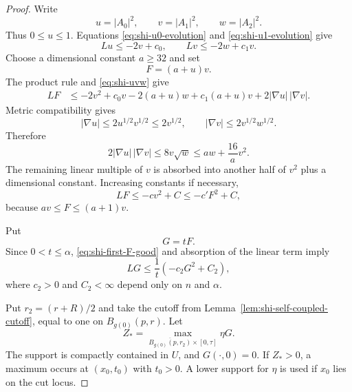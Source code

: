 \documentclass[10pt]{coll-l}
\theoremstyle{definition}
\theoremstyle{remark}
\numberwithin{section}{chapter}
\numberwithin{equation}{chapter}
\begin{document}
\begin{proof}
Write
\[
       u=|A_0|^2,
       \qquad v=|A_1|^2,
       \qquad w=|A_2|^2.
\]
Thus $0\leq u\leq1$.  Equations
\eqref{eq:shi-u0-evolution} and \eqref{eq:shi-u1-evolution} give
\begin{equation}
       Lu\leq-2v+c_0,
       \qquad Lv\leq-2w+c_1v.                            \label{eq:shi-uvw}
\end{equation}
Choose a dimensional constant $a\geq32$ and set
\begin{equation}
                  F=(a+u)v.                              \label{eq:shi-first-F}
\end{equation}
The product rule and \eqref{eq:shi-uvw} give
\begin{align}
 LF
  &\leq-2v^2+c_0v-2(a+u)w+c_1(a+u)v
        +2|\nabla u|\,|\nabla v|.                        \label{eq:shi-first-F-pre}
\end{align}
Metric compatibility gives
\[
       |\nabla u|\leq2u^{1/2}v^{1/2}\leq2v^{1/2},
       \qquad |\nabla v|\leq2v^{1/2}w^{1/2}.
\]
Therefore
\[
       2|\nabla u|\,|\nabla v|
          \leq8v\sqrt w
          \leq aw+\frac{16}{a}v^2.
\]
The remaining linear multiple of $v$ is absorbed into another half of
$v^2$ plus a dimensional constant.  Increasing constants if necessary,
\begin{equation}
               LF\leq-cv^2+C
                    \leq-c'F^2+C,                        \label{eq:shi-first-F-good}
\end{equation}
because $av\leq F\leq(a+1)v$.

Put
\begin{equation}
                         G=tF.                            \label{eq:shi-first-G}
\end{equation}
Since $0<t\leq\alpha$, \eqref{eq:shi-first-F-good} and absorption of the
linear term imply
\begin{equation}
                LG\leq\frac1t(-c_2G^2+C_2),              \label{eq:shi-first-G-good}
\end{equation}
where $c_2>0$ and $C_2<\infty$ depend only on $n$ and $\alpha$.

Put $r_2=(r+R)/2$ and take the cutoff from
Lemma~\ref{lem:shi-self-coupled-cutoff}, equal to one on $B_{g(0)}(p,r)$.
Let
\[
        Z_*=\max_{\overline{B_{g(0)}(p,r_2)}\times[0,\tau]}\eta G.
\]
The support is compactly contained in $U$, and $G(\cdot,0)=0$.  If
$Z_*>0$, a maximum occurs at $(x_0,t_0)$ with $t_0>0$.  A lower support for
$\eta$ is used if $x_0$ lies on the cut locus.


\end{proof}
\end{document}
